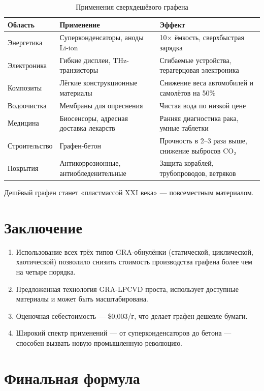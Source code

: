 \documentclass[12pt,a4paper]{article}
\begin{document}
\begin{table}[h]
\centering
\caption{Применения сверхдешёвого графена}
\label{tab:apps}
\begin{tabular}{|p{3cm}|p{5cm}|p{5cm}|}
\hline
Область & Применение & Эффект \\
\hline
Энергетика & Суперконденсаторы, аноды Li-ion & 10× ёмкость, сверхбыстрая зарядка \\
Электроника & Гибкие дисплеи, THz-транзисторы & Сгибаемые устройства, терагерцовая электроника \\
Композиты & Лёгкие конструкционные материалы & Снижение веса автомобилей и самолётов на 50\% \\
Водоочистка & Мембраны для опреснения & Чистая вода по низкой цене \\
Медицина & Биосенсоры, адресная доставка лекарств & Ранняя диагностика рака, умные таблетки \\
Строительство & Графен-бетон & Прочность в 2–3 раза выше, снижение выбросов CO₂ \\
Покрытия & Антикоррозионные, антиобледенительные & Защита кораблей, трубопроводов, ветряков \\
\hline
\end{tabular}
\end{table}

Дешёвый графен станет «пластмассой XXI века» — повсеместным материалом.

\section{Заключение}

\begin{enumerate}
    \item Использование всех трёх типов GRA-обнулёнки (статической, циклической, хаотической) позволило снизить стоимость производства графена более чем на четыре порядка.
    \item Предложенная технология GRA-LPCVD проста, использует доступные материалы и может быть масштабирована.
    \item Оценочная себестоимость — \$0,003/г, что делает графен дешевле бумаги.
    \item Широкий спектр применений — от суперконденсаторов до бетона — способен вызвать новую промышленную революцию.
\end{enumerate}

\section*{Финальная формула}
\end{document}

